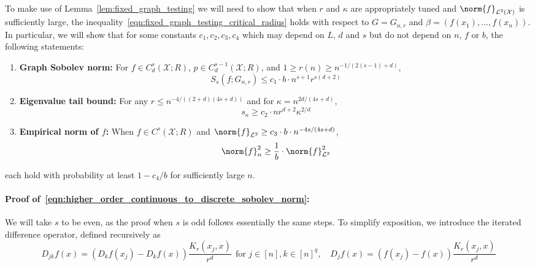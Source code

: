 \documentclass{article}
\newcommand{\1}{\mathbf{1}}
\newcommand{\Xset}{\mathcal{X}}
\newcommand{\Leb}{\mathcal{L}}
\theoremstyle{alden}
\theoremstyle{aldenthm}
\theoremstyle{definition}
\theoremstyle{remark}
\begin{document}
To make use of Lemma~\ref{lem:fixed_graph_testing} we will need to show that when $r$ and $\kappa$ are appropriately tuned and $\norm{f}_{\Leb^2(\mathcal{X})}$ is sufficiently large, the inequality~\eqref{eqn:fixed_graph_testing_critical_radius} holds with respect to $G = G_{n,r}$ and $\beta = (f(x_1),\ldots,f(x_n))$. In particular, we will show that for some constants $c_1,c_2,c_3,c_4$ which may depend on $L$, $d$ and $s$ but do not depend on $n$, $f$ or $b$, the following statements:
\begin{enumerate}[label=(E\arabic*)]
	\item 
	\label{event:higher_order_discrete_sobolev_norm}
	\textbf{Graph Sobolev norm:} For $f \in C_d^{s}(\mathcal{X};R)$, $p \in C_d^{s - 1}(\Xset;R)$, and $1 \geq r(n) \geq n^{-1/(2(s - 1) + d)}$,
	\begin{equation}
	\label{eqn:higher_order_continuous_to_discrete_sobolev_norm}
	S_s(f;G_{n,r}) \leq c_1 \cdot b \cdot n^{s + 1} r^{s(d + 2)} 
	\end{equation}
	\item 
	\label{event:higher_order_eigenvalue_tail_decay}
	\textbf{Eigenvalue tail bound:} For any $r \leq n^{-4/((2+d)(4s + d))}$ and for $\kappa = n^{2d/(4s + d)}$, 
	\begin{equation}
	\label{eqn:higher_order_eigenvalue_tail_bound}
	s_{\kappa} \geq c_2 \cdot n r^{d + 2} \kappa^{2/d}
	\end{equation}
	\item 
	\label{event:higher_order_l2_norm}
	\textbf{Empirical norm of $f$:} When $f \in C^{s}(\mathcal{X};R)$ and $\norm{f}_{\Leb^2} \geq c_3 \cdot b \cdot n^{-4s/(4s + d)}$,
	\begin{equation}
	\label{eqn:higher_order_l2_to_empirical_norm}
	\norm{f}_n^2 \geq \frac{1}{b} \cdot \norm{f}_{\Leb^2}^2
	\end{equation}
\end{enumerate} 

each hold with probability at least $1 - c_4/b$ for sufficiently large $n$.

\paragraph{Proof of~\eqref{eqn:higher_order_continuous_to_discrete_sobolev_norm}:}

We will take $s$ to be even, as the proof when $s$ is odd follows essentially the same steps. To simplify exposition, we introduce the iterated difference operator, defined recursively as
\begin{equation*}
D_{jk}f(x) = (D_{k}f(x_j) - D_{k}f(x))\frac{K_r(x_j,x)}{r^d}~~\textrm{for $j \in [n], k \in [n]^q$}, \quad D_jf(x) = (f(x_j) - f(x))\frac{K_r(x_j,x)}{r^d}
\end{equation*}
\end{document}
